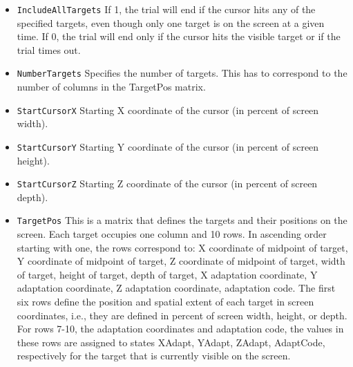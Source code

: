 \documentclass[letterpaper,oneside,12pt]{article}
\begin{document}
\begin{itemize}
  \item {\tt IncludeAllTargets} If 1, the trial will end if the cursor hits
        any of the specified targets, even though only one target is on
        the screen at a given time. If 0, the trial will end only if the cursor
        hits the visible target or if the trial times out.
  \item {\tt NumberTargets} Specifies the number of targets. This has to correspond
        to the number of columns in the TargetPos matrix.       
  \item {\tt StartCursorX} Starting X coordinate of the cursor (in percent of screen width).
  \item {\tt StartCursorY} Starting Y coordinate of the cursor (in percent of screen height).
  \item {\tt StartCursorZ} Starting Z coordinate of the cursor (in percent of screen depth).
  \item {\tt TargetPos} This is a matrix that defines the targets and their
        positions on the screen. Each target occupies one column and 10 rows.
        In ascending order starting with one, the rows correspond to:
        X coordinate of midpoint of target, Y coordinate of midpoint of target,
        Z coordinate of midpoint of target, width of target, height of target,
        depth of target, X adaptation coordinate, Y adaptation coordinate, Z adaptation
        coordinate, adaptation code. The first six rows define the position and
        spatial extent of each target in screen coordinates, i.e., they are defined 
        in percent of screen width, height, or depth. For rows 7-10, the
        adaptation coordinates and adaptation code, the values in these
        rows are assigned to states XAdapt, YAdapt, ZAdapt, AdaptCode, 
        respectively for the target that is currently visible on the screen.
\end{itemize}
\end{document}
